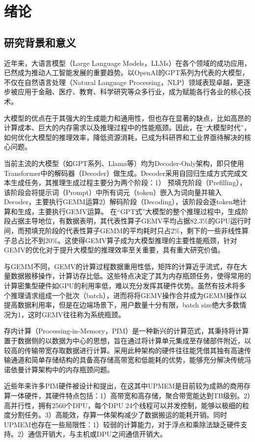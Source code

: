 \chapter{绪论}
\section{研究背景和意义}
近年来，大语言模型（Large Language Models，LLMs）在各个领域的成功应用，已然成为推动人工智能发展的重要趋势。以OpenAI的GPT系列为代表的大模型，不仅在自然语言处理（Natural Language Processing，NLP）领域表现卓越，更逐步被应用于金融、医疗、教育、科学研究等众多行业，成为赋能各行各业的核心技术。

大模型的优点在于其强大的生成能力和通用性，但也存在显著的缺点，比如高昂的计算成本、巨大的内存需求以及推理过程中的性能瓶颈。因此，在“大模型时代”，如何优化大模型的推理效率，降低资源消耗，已成为科研界和工业界亟待解决的核心问题。

当前主流的大模型（如GPT系列、Llama等）均为Decoder-Only架构，即只使用Transformer中的解码器（Decoder）做生成\cite{GPT-1,Llama2}。Decoder采用自回归生成方式完成文本生成任务，其推理生成过程主要分为两个阶段：1） 预填充阶段（Prefilling），该阶段会将提示词（Prompt）中所有词元（token）嵌入为词向量并输入Decoder，主要执行GEMM运算2）解码阶段（Decoding），该阶段会逐token地计算和生成，主要执行GEMV运算。
在“GPT式”大模型的整个推理过程中，生成阶段占据主导地位，有数据表明，其代表性算子GEMV平均占据82.3\%的GPU运行时间，而预填充阶段的代表性算子GEMM的平均耗时只占2\%，剩下的一些非线性算子总占比不到20\%\cite{SamsungHotChips}。这使得GEMV算子成为大模型推理的主要性能瓶颈，针对GEMV的优化对于提升大模型的推理效率至关重要，具有重大研究价值。

与GEMM不同，GEMV的计算过程数据重用性低，矩阵的计算近乎流式，存在大量数据搬移操作，计算访存比低。这些特点决定了其为内存瓶颈任务，使得常用的计算密集型硬件如GPU的利用率低，难以充分发挥其硬件优势。虽然有技术将多个推理请求组成一个批次（batch），进而将将GEMV操作合并成为GEMM操作以提高数据利用率\cite{Orca}，但是在边端场景下，用户数量十分有限，batch size绝大多数情况为1，这时GEMV往往称为系统瓶颈\cite{CellularLogicInMemory}。

存内计算（Processing-in-Memory，PIM）是一种新兴的计算范式，其秉持将计算置于数据侧的以数据为中心的思想，旨在通过将计算单元集成至存储部件附近，以较高的传输带宽存取数据进行计算。采用此种架构的硬件往往能凭借其独有高速传输通道和简单存储结构的具备高存储高带宽和低能耗的优势，能够充分解决传统冯诺依曼计算架构中的内存瓶颈问题。

近些年来许多PIM硬件被设计和提出\cite{SamsungHBMPIM,AxDIMM,AiM,AlibabaPIM,UPMEMHotChips}，在这其中UPMEM是目前较为成熟的商用存算一体硬件，其硬件特点包括：1）高带宽和高存储，聚合带宽能达到TB级别。2）高并行性，拥有2560个DPU，每个DPU 24个线程可以并发控制，能够以极细的粒度分割任务。3）高能效，存算一体架构减少了数据搬运的能耗开销。同时UPMEM也存在一些局限性：1）较弱的计算能力，对于浮点和乘除法缺乏硬件支持。2）通信开销大，与主机或DPU之间通信开销大。

